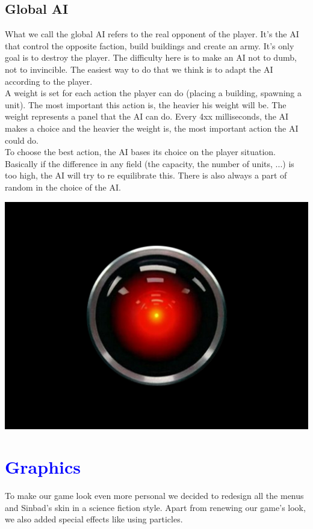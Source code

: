 \documentclass[article]{report}         %
\begin{document}
      \section{Global AI}
	What we call the global AI refers to the real opponent of the player. It's the AI that control the opposite faction, build buildings and create an army. It's only goal is to destroy the player. The difficulty here is to make an AI not to dumb, not to invincible. The easiest way to do that we think is to adapt the AI according to the player. \\

A weight is set for each action the player can do (placing a building, spawning a unit). The most important this action is, the heavier his weight will be. The weight represents a panel that the AI can do. Every 4xx milliseconds, the AI makes a choice and the heavier the weight is, the most important action the AI could do.\\

To choose the best action, the AI bases its choice on the player situation. Basically if the difference in any field (the capacity, the number of units, ...) is too high, the AI will try to re equilibrate this. There is also always a part of random in the choice of the AI.
  \begin{center}
    \includegraphics[width=14cm]{images/hal.jpg}
  \end{center} 

    \chapter{\textcolor{blue}{Graphics}}
    To make our game look even more personal we decided to redesign all the menus and Sinbad's skin in a science fiction style. Apart from renewing our game's look, we also added special effects like using particles.\\
\end{document}
